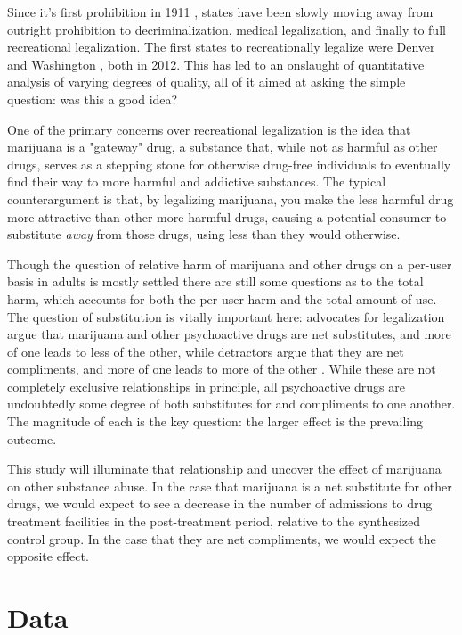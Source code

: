 \documentclass{article}
\begin{document}

Since it's first prohibition in 1911 \citep{SAGE}, states have been slowly moving away from outright prohibition to decriminalization, medical legalization, and finally to full recreational legalization. The first states to recreationally legalize were Denver and Washington \citep{Reuters}, both in 2012. This has led to an onslaught of quantitative analysis of varying degrees of quality, all of it aimed at asking the simple question: was this a good idea?

One of the primary concerns over recreational legalization is the idea that marijuana is a "gateway" drug, a substance that, while not as harmful as other drugs, serves as a stepping stone for otherwise drug-free individuals to eventually find their way to more harmful and addictive substances. The typical counterargument is that, by legalizing marijuana, you make the less harmful drug more attractive than other more harmful drugs, causing a potential consumer to substitute \emph{away} from those drugs, using less than they would otherwise.

Though the question of relative harm of marijuana and other drugs on a per-user basis in adults is mostly settled \citep[p. 27-48]{MedicRev} there are still some questions as to the total harm, which accounts for both the per-user harm and the total amount of use. The question of substitution is vitally important here: advocates for legalization argue that marijuana and other psychoactive drugs are net substitutes, and more of one leads to less of the other, while detractors argue that they are net compliments, and more of one leads to more of the other \citep[p. 157-162]{MedicRev}. While these are not completely exclusive relationships in principle, all psychoactive drugs are undoubtedly some degree of both substitutes for and compliments to one another. The magnitude of each is the key question: the larger effect is the prevailing outcome.

This study will illuminate that relationship and uncover the effect of marijuana on other substance abuse. In the case that marijuana is a net substitute for other drugs, we would expect to see a decrease in the number of admissions to drug treatment facilities in the post-treatment period, relative to the synthesized control group. In the case that they are net compliments, we would expect the opposite effect.

\section{Data}
\end{document}
